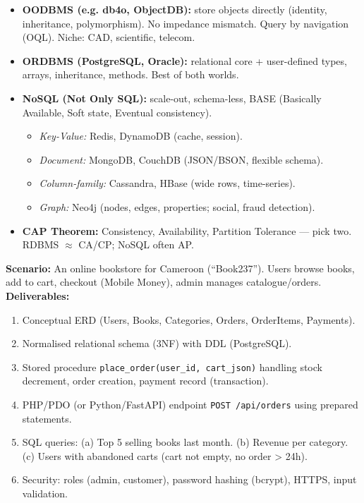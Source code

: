 \documentclass[11pt]{article}
\begin{document}
\begin{definition}
\begin{itemize}
\item \textbf{OODBMS (e.g. db4o, ObjectDB):} store objects directly (identity, inheritance, polymorphism). No impedance mismatch. Query by navigation (OQL). Niche: CAD, scientific, telecom.
\item \textbf{ORDBMS (PostgreSQL, Oracle):} relational core + user-defined types, arrays, inheritance, methods. Best of both worlds.
\item \textbf{NoSQL (Not Only SQL):} scale-out, schema-less, BASE (Basically Available, Soft state, Eventual consistency).
\begin{itemize}
\item \emph{Key-Value:} Redis, DynamoDB (cache, session).
\item \emph{Document:} MongoDB, CouchDB (JSON/BSON, flexible schema).
\item \emph{Column-family:} Cassandra, HBase (wide rows, time-series).
\item \emph{Graph:} Neo4j (nodes, edges, properties; social, fraud detection).
\end{itemize}
\item \textbf{CAP Theorem:} Consistency, Availability, Partition Tolerance — pick two. RDBMS $\approx$ CA/CP; NoSQL often AP.
\end{itemize}
\end{definition}

\begin{experience}
\textbf{Scenario:} An online bookstore for Cameroon (``Book237''). Users browse books, add to cart, checkout (Mobile Money), admin manages catalogue/orders.
\textbf{Deliverables:}
\begin{enumerate}
\item Conceptual ERD (Users, Books, Categories, Orders, OrderItems, Payments).
\item Normalised relational schema (3NF) with DDL (PostgreSQL).
\item Stored procedure \texttt{place\_order(user\_id, cart\_json)} handling stock decrement, order creation, payment record (transaction).
\item PHP/PDO (or Python/FastAPI) endpoint \texttt{POST /api/orders} using prepared statements.
\item SQL queries: (a) Top 5 selling books last month. (b) Revenue per category. (c) Users with abandoned carts (cart not empty, no order > 24h).
\item Security: roles (admin, customer), password hashing (bcrypt), HTTPS, input validation.
\end{enumerate}
\end{experience}
\end{document}
